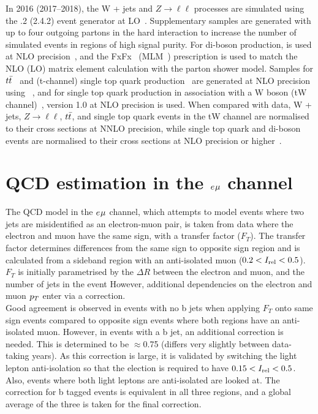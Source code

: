 In 2016 (2017--2018), the W + jets and $Z\rightarrow \ell\ell$ processes are simulated using the .2 (2.4.2) event generator at \ac{LO}~\cite{Alwall:2011uj}. 
Supplementary samples are generated with up to four outgoing partons in the hard interaction to increase the number of simulated events in regions of high signal purity. 
For di-boson production, \MGvATNLO is used at \ac{NLO} precision~\cite{Alwall:2011uj}, and the FxFx~\cite{Frederix:2012ps} (MLM~\cite{Alwall:2007fs}) prescription is used to match the \ac{NLO} (\ac{LO}) matrix element calculation with the parton shower model. 
Samples for $t\bar{t}$~\cite{Alioli:2011as} and (t-channel) single top quark production~\cite{Frederix:2012dh} are generated at \ac{NLO} precision using ~\cite{Nason:2004rx,Frixione:2007vw,Alioli:2010xd,Jezo:2015aia}, and for single top quark production in association with a W boson (tW channel)~\cite{Re:2010bp}, \POWHEG version 1.0 at \ac{NLO} precision is used. 
When compared with data, W + jets, $Z\rightarrow \ell\ell$, $t\bar{t}$, and single top quark events in the tW channel are normalised to their cross sections at \ac{NNLO} precision\cite{Melnikov:2006kv,Czakon:2011xx,Kidonakis:2013zqa}, while single top quark and di-boson events are normalised to their cross sections at \ac{NLO} precision or higher~\cite{Kidonakis:2013zqa,Campbell:2011bn,Gehrmann:2014fva}.

\section{QCD estimation in the $e_{}\mu_{}$ channel}
\label{sec:qcd}

The \ac{QCD} model in the $e_{}\mu_{}$ channel, which attempts to model events where two jets are misidentified as an electron-muon pair, is taken from data where the electron and muon have the same sign, with a transfer factor ($F_{T}$).
The transfer factor determines differences from the same sign to opposite sign region and is calculated from a sideband region with an anti-isolated muon ($0.2 < I_{\text{rel}} < 0.5$).
$F_{T}$ is initially parametrised by the $\Delta R$ between the electron and muon, and the number of jets in the event 
However, additional dependencies on the electron and muon $p_{T}$ enter via a correction. \\

Good agreement is observed in events with no b jets when applying $F_{T}$ onto same sign events compared to opposite sign events where both regions have an anti-isolated muon. 
However, in events with a b jet, an additional correction is needed.
This is determined to be $\approx$0.75 (differs very slightly between data-taking years).
As this correction is large, it is validated by switching the light lepton anti-isolation so that the election is required to have $0.15 < I_{\text{rel}} < 0.5$.
Also, events where both light leptons are anti-isolated are looked at.
The correction for b tagged events is equivalent in all three regions, and a global average of the three is taken for the final correction. \\

